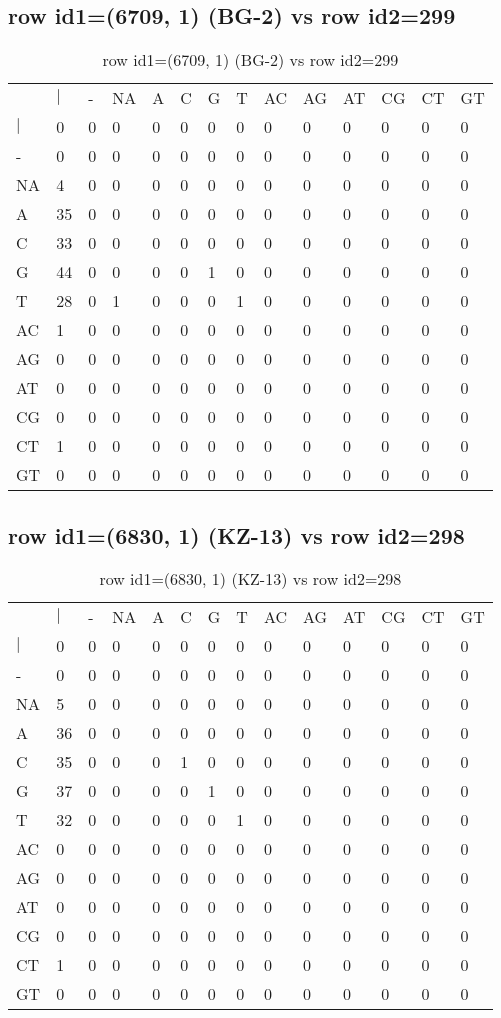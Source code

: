 \subsection{row id1=(6709, 1) (BG-2) vs row id2=299}
\begin{center}
\begin{longtable}{|l|l|l|l|l|l|l|l|l|l|l|l|l|l|}
\caption{row id1=(6709, 1) (BG-2) vs row id2=299} \label{table_dm52}\\
\hline
\\
\hline
&$|$&-&NA&A&C&G&T&AC&AG&AT&CG&CT&GT\\
$|$&0&0&0&0&0&0&0&0&0&0&0&0&0\\
-&0&0&0&0&0&0&0&0&0&0&0&0&0\\
NA&4&0&0&0&0&0&0&0&0&0&0&0&0\\
A&35&0&0&0&0&0&0&0&0&0&0&0&0\\
C&33&0&0&0&0&0&0&0&0&0&0&0&0\\
G&44&0&0&0&0&1&0&0&0&0&0&0&0\\
T&28&0&1&0&0&0&1&0&0&0&0&0&0\\
AC&1&0&0&0&0&0&0&0&0&0&0&0&0\\
AG&0&0&0&0&0&0&0&0&0&0&0&0&0\\
AT&0&0&0&0&0&0&0&0&0&0&0&0&0\\
CG&0&0&0&0&0&0&0&0&0&0&0&0&0\\
CT&1&0&0&0&0&0&0&0&0&0&0&0&0\\
GT&0&0&0&0&0&0&0&0&0&0&0&0&0\\
\hline
\end{longtable}
\end{center}

\subsection{row id1=(6830, 1) (KZ-13) vs row id2=298}
\begin{center}
\begin{longtable}{|l|l|l|l|l|l|l|l|l|l|l|l|l|l|}
\caption{row id1=(6830, 1) (KZ-13) vs row id2=298} \label{table_dm54}\\
\hline
\\
\hline
&$|$&-&NA&A&C&G&T&AC&AG&AT&CG&CT&GT\\
$|$&0&0&0&0&0&0&0&0&0&0&0&0&0\\
-&0&0&0&0&0&0&0&0&0&0&0&0&0\\
NA&5&0&0&0&0&0&0&0&0&0&0&0&0\\
A&36&0&0&0&0&0&0&0&0&0&0&0&0\\
C&35&0&0&0&1&0&0&0&0&0&0&0&0\\
G&37&0&0&0&0&1&0&0&0&0&0&0&0\\
T&32&0&0&0&0&0&1&0&0&0&0&0&0\\
AC&0&0&0&0&0&0&0&0&0&0&0&0&0\\
AG&0&0&0&0&0&0&0&0&0&0&0&0&0\\
AT&0&0&0&0&0&0&0&0&0&0&0&0&0\\
CG&0&0&0&0&0&0&0&0&0&0&0&0&0\\
CT&1&0&0&0&0&0&0&0&0&0&0&0&0\\
GT&0&0&0&0&0&0&0&0&0&0&0&0&0\\
\hline
\end{longtable}
\end{center}


